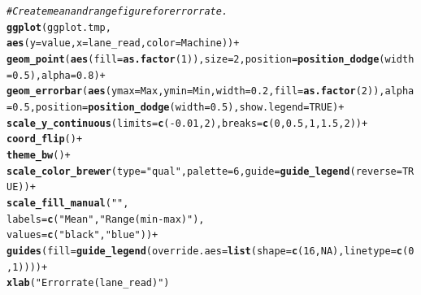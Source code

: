 \documentclass[a4paper,11pt,fleqn,twoside,notitlepage]{report}
\makeatletter
\newcommand{\hlnum}[1]{\textcolor[rgb]{0.686,0.059,0.569}{#1}}%
\newcommand{\hlstr}[1]{\textcolor[rgb]{0.192,0.494,0.8}{#1}}%
\newcommand{\hlcom}[1]{\textcolor[rgb]{0.678,0.584,0.686}{\textit{#1}}}%
\newcommand{\hlopt}[1]{\textcolor[rgb]{0,0,0}{#1}}%
\newcommand{\hlstd}[1]{\textcolor[rgb]{0.345,0.345,0.345}{#1}}%
\newcommand{\hlkwc}[1]{\textcolor[rgb]{0.333,0.667,0.333}{#1}}%
\newcommand{\hlkwd}[1]{\textcolor[rgb]{0.737,0.353,0.396}{\textbf{#1}}}%
\newenvironment{kframe}{%
 \def\at@end@of@kframe{}%
 \ifinner\ifhmode%
  \def\at@end@of@kframe{\end{minipage}}%
  \begin{minipage}{\columnwidth}%
 \fi\fi%
 \def\FrameCommand##1{\hskip\@totalleftmargin \hskip-\fboxsep
 \colorbox{shadecolor}{##1}\hskip-\fboxsep
     \hskip-\linewidth \hskip-\@totalleftmargin \hskip\columnwidth}%
 \MakeFramed {\advance\hsize-\width
   \@totalleftmargin\z@ \linewidth\hsize
   \@setminipage}}%
 {\par\unskip\endMakeFramed%
 \at@end@of@kframe}
\newenvironment{knitrout}{}{} %
\makeatother
\begin{document}
\begin{knitrout}
\begin{kframe}
\begin{alltt}
\hlcom{# Create mean and range figure for error rate.}
\hlkwd{ggplot}\hlstd{(ggplot.tmp,}
       \hlkwd{aes}\hlstd{(}\hlkwc{y}\hlstd{=value,} \hlkwc{x}\hlstd{=lane_read,} \hlkwc{color}\hlstd{=Machine))} \hlopt{+}
  \hlkwd{geom_point}\hlstd{(}\hlkwd{aes}\hlstd{(}\hlkwc{fill}\hlstd{=}\hlkwd{as.factor}\hlstd{(}\hlnum{1}\hlstd{)),} \hlkwc{size}\hlstd{=}\hlnum{2}\hlstd{,} \hlkwc{position}\hlstd{=}\hlkwd{position_dodge}\hlstd{(}\hlkwc{width}\hlstd{=}\hlnum{0.5}\hlstd{),} \hlkwc{alpha}\hlstd{=}\hlnum{0.8}\hlstd{)} \hlopt{+}
  \hlkwd{geom_errorbar}\hlstd{(}\hlkwd{aes}\hlstd{(}\hlkwc{ymax}\hlstd{=Max,} \hlkwc{ymin}\hlstd{=Min,} \hlkwc{width}\hlstd{=}\hlnum{0.2}\hlstd{,} \hlkwc{fill}\hlstd{=}\hlkwd{as.factor}\hlstd{(}\hlnum{2}\hlstd{)),} \hlkwc{alpha}\hlstd{=}\hlnum{0.5}\hlstd{,} \hlkwc{position}\hlstd{=}\hlkwd{position_dodge}\hlstd{(}\hlkwc{width}\hlstd{=}\hlnum{0.5}\hlstd{),} \hlkwc{show.legend} \hlstd{=} \hlnum{TRUE}\hlstd{)} \hlopt{+}
  \hlkwd{scale_y_continuous}\hlstd{(}\hlkwc{limits}\hlstd{=}\hlkwd{c}\hlstd{(}\hlopt{-}\hlnum{0.01}\hlstd{,}\hlnum{2}\hlstd{),} \hlkwc{breaks} \hlstd{=} \hlkwd{c}\hlstd{(}\hlnum{0}\hlstd{,}\hlnum{0.5}\hlstd{,}\hlnum{1}\hlstd{,}\hlnum{1.5}\hlstd{,}\hlnum{2}\hlstd{))} \hlopt{+}
  \hlkwd{coord_flip}\hlstd{()} \hlopt{+}
  \hlkwd{theme_bw}\hlstd{()} \hlopt{+}
  \hlkwd{scale_color_brewer}\hlstd{(}\hlkwc{type} \hlstd{=} \hlstr{"qual"}\hlstd{,} \hlkwc{palette}\hlstd{=}\hlnum{6}\hlstd{,}\hlkwc{guide} \hlstd{=} \hlkwd{guide_legend}\hlstd{(}\hlkwc{reverse}\hlstd{=}\hlnum{TRUE}\hlstd{))} \hlopt{+}
  \hlkwd{scale_fill_manual}\hlstd{(}\hlstr{""}\hlstd{,}
                    \hlkwc{labels}\hlstd{=}\hlkwd{c}\hlstd{(}\hlstr{"Mean"}\hlstd{,}\hlstr{"Range (min-max)"}\hlstd{),}
                    \hlkwc{values} \hlstd{=}\hlkwd{c}\hlstd{(}\hlstr{"black"}\hlstd{,}\hlstr{"blue"}\hlstd{))} \hlopt{+}
  \hlkwd{guides}\hlstd{(}\hlkwc{fill}\hlstd{=}\hlkwd{guide_legend}\hlstd{(}\hlkwc{override.aes}\hlstd{=}\hlkwd{list}\hlstd{(}\hlkwc{shape}\hlstd{=}\hlkwd{c}\hlstd{(}\hlnum{16}\hlstd{,}\hlnum{NA}\hlstd{),} \hlkwc{linetype}\hlstd{=}\hlkwd{c}\hlstd{(}\hlnum{0}\hlstd{,}\hlnum{1}\hlstd{))))} \hlopt{+}
  \hlkwd{xlab}\hlstd{(}\hlstr{"Error rate (lane_read)"}\hlstd{)}
\end{alltt}
\end{kframe}\begin{figure}[!htb]

\end{figure}
\end{knitrout}
\end{document}
